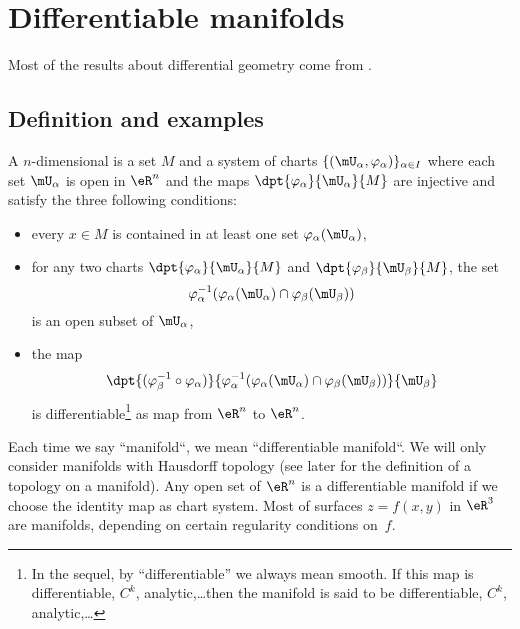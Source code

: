 
\section{Differentiable manifolds}

Most of the results about differential geometry come from \cite{kobayashi, madore, Helgason, ms_book, dgbook}.

\subsection{Definition and examples}

\begin{definition}
    A $n$-dimensional  is a set $M$ and a system of charts $\{(\mU_{\alpha},\varphi_{\alpha})\}_{\alpha\in I}$ where each set $\mU_{\alpha}$ is open in $\eR^n$ and the maps $\dpt{\varphi_{\alpha}}{\mU_{\alpha}}{M}$ are injective and satisfy the three following conditions:

    \begin{itemize}
    \item every $x\in M$ is contained in at least one set $\varphi_{\alpha}(\mU_{\alpha})$,
    \item for any two charts $\dpt{\varphi_{\alpha}}{\mU_{\alpha}}{M}$ and $\dpt{\varphi_{\beta}}{\mU_{\beta}}{M}$, the set
    \[
       \varphi_{\alpha}^{-1}( \varphi_{\alpha}(\mU_{\alpha})\cap\varphi_{\beta}(\mU_{\beta}) )
    \]
    is an open subset of $\mU_{\alpha}$,
    \item the map
    \[
      \dpt{  (\varphi_{\beta}^{-1}\circ\varphi_{\alpha})  }{   \varphi_{\alpha}^{-1}( \varphi_{\alpha}(\mU_{\alpha})\cap\varphi_{\beta}(\mU_{\beta})  )   }{\mU_{\beta}}
    \]
    is differentiable\footnote{In the sequel, by ``differentiable'' we always mean smooth. If this map is differentiable, $C^k$, analytic,\ldots then the manifold is said to be differentiable, $C^k$, analytic,\ldots} as map from $\eR^n$ to $\eR^n$.
    \end{itemize}
\end{definition}

Each time we say ``manifold``, we mean ``differentiable manifold``. We will only consider manifolds with Hausdorff topology (see later for the definition of a topology on a manifold). Any open set of $\eR^n$ is a differentiable manifold if we choose the identity map as chart system. Most of surfaces $z=f(x,y)$ in $\eR^3$ are manifolds, depending on certain regularity conditions on~$f$.

